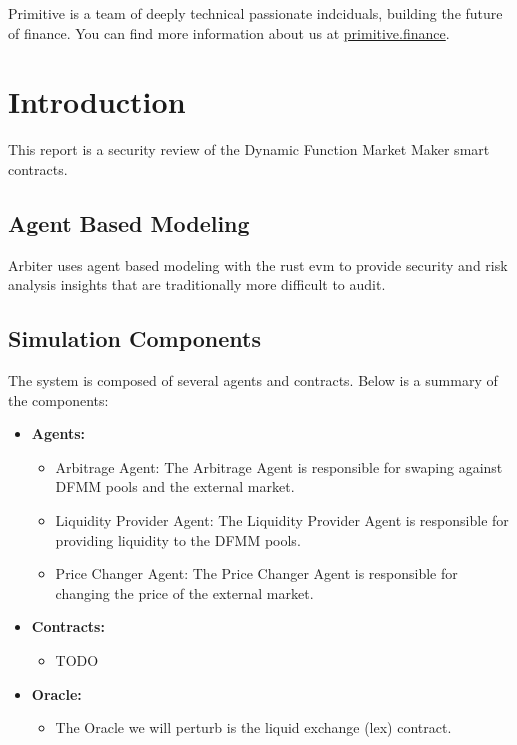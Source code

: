 \documentclass[14pt]{extarticle}
\begin{document}
Primitive is a team of deeply technical passionate indciduals, building
the future of finance.
You can find more information about us at \href{https://primitive.finance}{primitive.finance}.

\section{Introduction}\label{introduction}

This report is a security review of the Dynamic Function Market Maker smart contracts.

\subsection{Agent Based Modeling}\label{agent-based-modeling}

Arbiter uses agent based modeling with the rust evm to provide security
and risk analysis insights that are traditionally more difficult to
audit.

\subsection{Simulation Components}\label{simulation-components}

The system is composed of several agents and contracts. Below is a summary of the components:

\begin{itemize}
\item \textbf{Agents:}
  \begin{itemize}
  \item Arbitrage Agent: The Arbitrage Agent is responsible for swaping against DFMM pools and the external market.
  \item Liquidity Provider Agent: The Liquidity Provider Agent is responsible for providing liquidity to the DFMM pools.
  \item Price Changer Agent: The Price Changer Agent is responsible for changing the price of the external market.
  \end{itemize}
\item \textbf{Contracts:}
  \begin{itemize}
  \item TODO
  \end{itemize}
\item \textbf{Oracle:}
  \begin{itemize}
  \item The Oracle we will perturb is the liquid exchange (lex) contract.
  \end{itemize}
\end{itemize}
\end{document}
